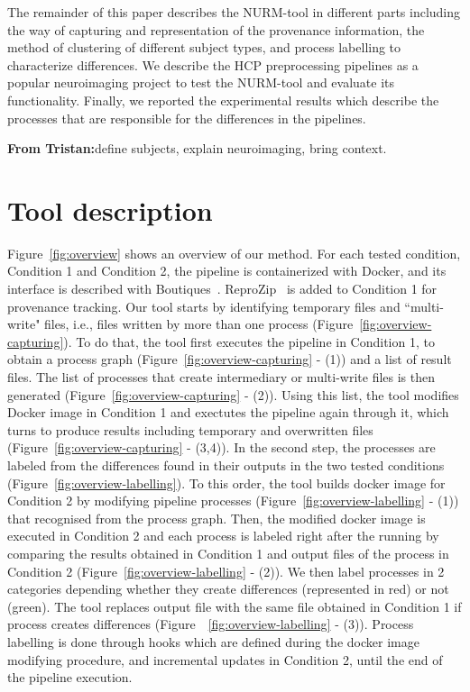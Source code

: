 \documentclass[a4paper,num-refs]{oup-contemporary}
\newcommand{\reprozip}[0]{ReproZip\xspace}
\newcommand{\tristan}[1]{\color{blue}\textbf{From Tristan:}#1\color{black}}
\begin{document}
The remainder of this paper describes the NURM-tool in different parts 
including the way of capturing and representation of the provenance 
information, the method of clustering of different subject types, and 
process labelling to characterize differences. We describe the HCP 
preprocessing pipelines as a popular neuroimaging project to test the 
NURM-tool and evaluate its functionality. Finally, we reported the 
experimental results which describe the processes that are responsible 
for the differences in the pipelines.

\tristan{define subjects, explain neuroimaging, bring context.}
\section{Tool description}

Figure~\ref{fig:overview} shows an overview of our method. For each tested
condition, Condition 1 and Condition 2, the pipeline is containerized with
Docker, and its interface is described with
Boutiques~\cite{glatard2017boutiques}. \reprozip~\cite{Chirigati2016} is
added to Condition 1 for provenance tracking. Our tool starts by
identifying temporary files and ``multi-write" files, i.e., files written
by more than one process (Figure~\ref{fig:overview-capturing}). To do that,
the tool first executes the pipeline in Condition 1, to obtain a process
graph (Figure~\ref{fig:overview-capturing} - (1)) and a list of result files.
The list of processes that create intermediary or multi-write
files is then generated (Figure~\ref{fig:overview-capturing} - (2)). 
Using this list, the tool modifies Docker image in Condition 1 and
exectutes the pipeline again through it, which turns to produce results
including temporary and overwritten files
(Figure~\ref{fig:overview-capturing} - (3,4)). In the second step, the
processes are labeled from the differences found in their outputs in the
two tested conditions (Figure~\ref{fig:overview-labelling}). To this order,
the tool builds docker image for Condition 2 by modifying pipeline
processes (Figure~\ref{fig:overview-labelling} - (1)) that recognised from 
the process graph. Then, the modified docker
image is executed in Condition 2 and each process is labeled right after
the running by comparing the results obtained in Condition 1
and output files of the process in Condition 2
(Figure~\ref{fig:overview-labelling} - (2)). We then label processes in 2
categories depending whether they
create differences (represented in red) or not (green). 
The tool replaces output file with the same file obtained in Condition 1 
if process creates differences (Figure~~\ref{fig:overview-labelling} - (3)).
Process labelling
is done through hooks which are defined during the docker image modifying
procedure, and incremental updates in Condition 2, until the end of the
pipeline execution.
\end{document}
